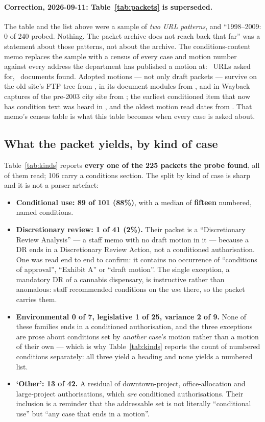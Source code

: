 \documentclass[11pt]{article}
\begin{document}
\paragraph{Correction, 2026-09-11: Table~\ref{tab:packets} is superseded.} The table and the
list above were a sample of \emph{two URL patterns}, and ``1998--2009: 0 of 240 probed.
Nothing. The packet archive does not reach back that far'' was a statement about those
patterns, not about the archive. The conditions-content memo replaces the sample with a census
of every case and motion number against every address the department has published a motion
at: \condProbed\ URLs asked for, \condProbeHits\ documents found. Adopted motions --- not
only draft packets --- survive on the old site's FTP tree from \condEarliestFtp, in its document
modules from \condEarliestModules, and in Wayback captures of the pre-2003 city site from
\condEarliestWayback; the earliest conditioned item that now has condition text was heard in
\condEarliestItemYear, and the oldest motion read dates from \condEarliestAny. That memo's census table is what this table becomes when every case is
asked about.


\subsection{What the packet yields, by kind of case}
\label{sec:complement}

Table~\ref{tab:kinds} reports \textbf{every one of the 225 packets the probe found}, all of
them read; 106 carry a conditions section. The split by kind of case is sharp and it is not a
parser artefact:

\begin{itemize}
\item \textbf{Conditional use: 89 of 101 (88\%)}, with a median of \textbf{fifteen} numbered,
named conditions.
\item \textbf{Discretionary review: 1 of 41 (2\%).} Their packet is a ``Discretionary Review
Analysis'' --- a staff memo with no draft motion in it --- because a DR ends in a
Discretionary Review Action, not a conditioned authorisation. One was read end to end to
confirm: it contains no occurrence of ``conditions of approval'', ``Exhibit A'' or ``draft
motion''. The single exception, a mandatory DR of a cannabis dispensary, is instructive
rather than anomalous: staff recommended conditions on the \emph{use} there, so the packet
carries them.
\item \textbf{Environmental 0 of 7, legislative 1 of 25, variance 2 of 9.} None of these
families ends in a conditioned authorisation, and the three exceptions are prose about
conditions set by \emph{another} case's motion rather than a motion of their own --- which is
why Table~\ref{tab:kinds} reports the count of numbered conditions separately: all three
yield a heading and none yields a numbered list.
\item \textbf{`Other': 13 of 42.} A residual of downtown-project, office-allocation and
large-project authorisations, which \emph{are} conditioned authorisations. Their inclusion is
a reminder that the addressable set is not literally ``conditional use'' but ``any case that
ends in a motion''.
\end{itemize}
\end{document}
